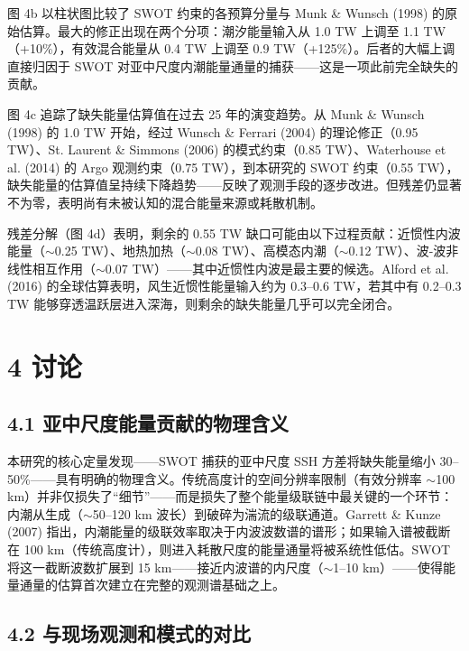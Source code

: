 \documentclass[11pt,a4paper]{article}
\begin{document}
图 4b 以柱状图比较了 SWOT 约束的各预算分量与 Munk \& Wunsch (1998) 的原始估算。最大的修正出现在两个分项：潮汐能量输入从 1.0 TW 上调至 1.1 TW（+10\%），有效混合能量从 0.4 TW 上调至 0.9 TW（+125\%）。后者的大幅上调直接归因于 SWOT 对亚中尺度内潮能量通量的捕获——这是一项此前完全缺失的贡献。\par

图 4c 追踪了缺失能量估算值在过去 25 年的演变趋势。从 Munk \& Wunsch (1998) 的 1.0 TW 开始，经过 Wunsch \& Ferrari (2004) 的理论修正（0.95 TW）、St. Laurent \& Simmons (2006) 的模式约束（0.85 TW）、Waterhouse et al. (2014) 的 Argo 观测约束（0.75 TW），到本研究的 SWOT 约束（0.55 TW），缺失能量的估算值呈持续下降趋势——反映了观测手段的逐步改进。但残差仍显著不为零，表明尚有未被认知的混合能量来源或耗散机制。\par

残差分解（图 4d）表明，剩余的 0.55 TW 缺口可能由以下过程贡献：近惯性内波能量（$\sim$0.25 TW）、地热加热（$\sim$0.08 TW）、高模态内潮（$\sim$0.12 TW）、波-波非线性相互作用（$\sim$0.07 TW）——其中近惯性内波是最主要的候选。Alford et al. (2016) 的全球估算表明，风生近惯性能量输入约为 0.3--0.6 TW，若其中有 0.2--0.3 TW 能够穿透温跃层进入深海，则剩余的缺失能量几乎可以完全闭合。\par

\section*{4  讨论}

\subsection*{4.1  亚中尺度能量贡献的物理含义}

本研究的核心定量发现——SWOT 捕获的亚中尺度 SSH 方差将缺失能量缩小 30--50\%——具有明确的物理含义。传统高度计的空间分辨率限制（有效分辨率 $\sim$100 km）并非仅损失了``细节''——而是损失了整个能量级联链中最关键的一个环节：内潮从生成（$\sim$50--120 km 波长）到破碎为湍流的级联通道。Garrett \& Kunze (2007) 指出，内潮能量的级联效率取决于内波波数谱的谱形；如果输入谱被截断在 100 km（传统高度计），则进入耗散尺度的能量通量将被系统性低估。SWOT 将这一截断波数扩展到 15 km——接近内波谱的内尺度（$\sim$1--10 km）——使得能量通量的估算首次建立在完整的观测谱基础之上。\par

\subsection*{4.2  与现场观测和模式的对比}
\end{document}
